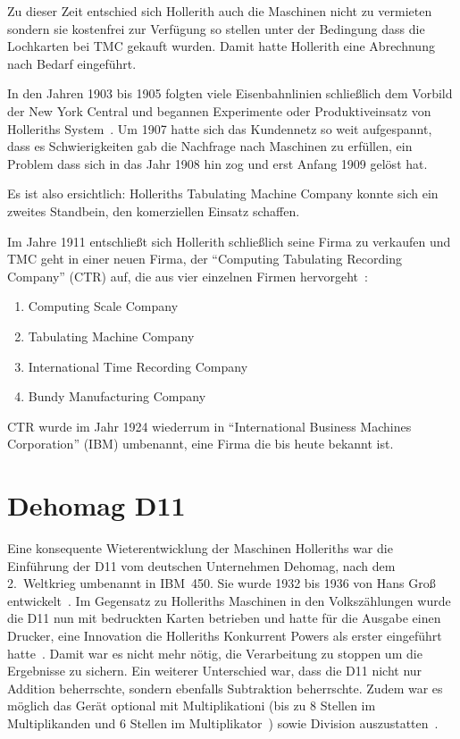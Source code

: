 \documentclass[parskip=half]{scrartcl}
\begin{document}
Zu dieser Zeit entschied sich Hollerith auch die Maschinen nicht zu vermieten
sondern sie kostenfrei zur Verfügung so stellen unter der Bedingung dass die
Lochkarten bei TMC gekauft wurden. Damit hatte Hollerith eine Abrechnung nach
Bedarf eingeführt.

In den Jahren 1903 bis 1905 folgten viele Eisenbahnlinien schließlich dem
Vorbild der New York Central und begannen Experimente oder Produktiveinsatz von
Holleriths System~\cite{austrian1982herman}. Um 1907 hatte sich das Kundennetz
so weit aufgespannt, dass es Schwierigkeiten gab die Nachfrage nach Maschinen
zu erfüllen, ein Problem dass sich in das Jahr 1908 hin zog und erst Anfang
1909 gelöst hat.

Es ist also ersichtlich: Holleriths Tabulating Machine Company konnte sich ein
zweites Standbein, den komerziellen Einsatz schaffen.

Im Jahre 1911 entschließt sich Hollerith schließlich seine Firma zu verkaufen
und TMC geht in einer neuen Firma, der \enquote{Computing Tabulating Recording
Company} (CTR) auf, die aus vier einzelnen Firmen
hervorgeht~\cite{austrian1982herman}:

\begin{enumerate}
  \item Computing Scale Company
  \item Tabulating Machine Company
  \item International Time Recording Company
  \item Bundy Manufacturing Company
\end{enumerate}

CTR wurde im Jahr 1924 wiederrum in \enquote{International Business Machines
Corporation} (IBM) umbenannt, eine Firma die bis heute bekannt ist.

\section{Dehomag D11}
\label{sec:d11}

Eine konsequente Wieterentwicklung der Maschinen Holleriths war die Einführung
der D11 vom deutschen Unternehmen Dehomag, nach dem 2.~Weltkrieg umbenannt in
IBM~450. Sie wurde 1932 bis 1936 von Hans Groß
entwickelt~\cite{deutschesMuseum}. Im Gegensatz zu Holleriths Maschinen in den
Volkszählungen wurde die D11 nun mit bedruckten Karten betrieben und hatte für
die Ausgabe einen Drucker, eine Innovation die Holleriths Konkurrent Powers als
erster eingeführt hatte~\cite{austrian1982herman}. Damit war es nicht mehr
nötig, die Verarbeitung zu stoppen um die Ergebnisse zu sichern. Ein weiterer
Unterschied war, dass die D11 nicht nur Addition beherrschte, sondern ebenfalls
Subtraktion beherrschte. Zudem war es möglich das Gerät optional mit
Multiplikationi (bis zu 8 Stellen im Multiplikanden und 6 Stellen im
Multiplikator~\cite{rojas2002first}) sowie Division
auszustatten~\cite{deutschesMuseum}.
\end{document}
